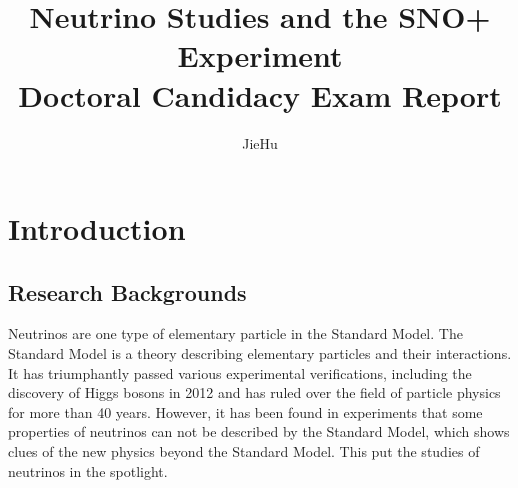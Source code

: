 \documentclass[preprint,12pt]{elsarticle}
\numberwithin{equation}{section}
\begin{document}
\begin{frontmatter}



\title{Neutrino Studies and the SNO+ Experiment\\
	Doctoral Candidacy Exam Report
	}


\author{Jie\quad Hu}

\address{Department of Physics, University of Alberta}

\end{frontmatter}


\section{Introduction}

\subsection{Research Backgrounds}
Neutrinos are one type of elementary particle in the Standard Model. The Standard Model is a theory describing elementary particles and their interactions. It has triumphantly passed various experimental verifications, including the discovery of Higgs bosons in 2012 and has ruled over the field of particle physics for more than 40 years. However, it has been found in experiments that some properties of neutrinos can not be described by the Standard Model, which shows clues of the new physics beyond the Standard Model. This put the studies of neutrinos in the spotlight.
\end{document}
